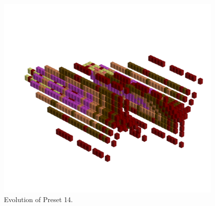 \clearpage                                                                 
\begin{figure}[H]                                                          
  \centering                                                             
  \begin{adjustbox}{width=14cm,center}                                   
  \includegraphics[width=14cm]{src/presets/pattern14-45.png}%
  \end{adjustbox}                                                        
\caption{Evolution of Preset 14.}                                           
\end{figure}                                                               
\clearpage                                                                 
                                                                           
